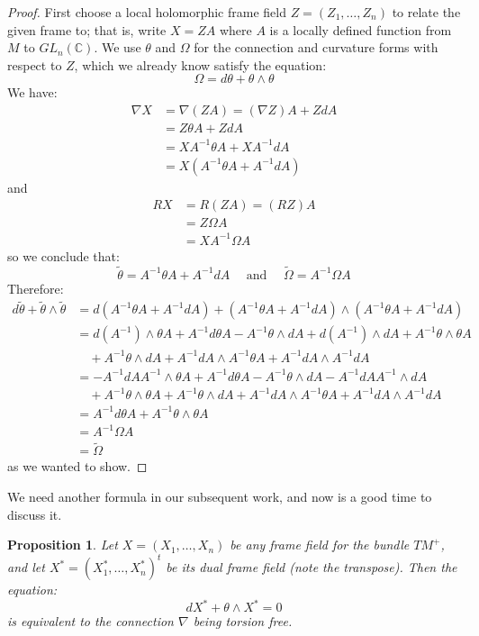 \documentclass[11pt]{amsart}
\newtheorem{prop}[subsection]{Proposition}
\theoremstyle{definition}
\def \C{ \mathbb{C} }
\def \thetasquig{ \tilde{\theta} }
\def \Omegasquig{ \tilde{\Omega} }
\begin{document}
\begin{proof}
%
First choose a local holomorphic frame field $Z = (Z_1, \ldots, Z_n)$ to relate the given frame to; that is, write $X = ZA$ where $A$ is a locally defined function from $M$ to $GL_n (\C)$.  We use $\theta$ and $\Omega$ for the connection and curvature forms with respect to $Z$, which we already know satisfy the equation:
%
$$ \Omega = d \theta + \theta \wedge \theta $$
%
We have:
%
\begin{align*}
\nabla X &= \nabla( ZA ) = (\nabla Z) A + Z dA \\
&= Z \theta A + Z dA \\ 
&= X A^{-1} \theta A + X A^{-1} dA \\
&= X( A^{-1} \theta A + A^{-1} dA )
\end{align*}
%
and
%
\begin{align*}
RX &= R(ZA) = (RZ)A \\
&= Z \Omega A \\
&= X A^{-1} \Omega A
\end{align*}
%
so we conclude that:
%
$$ \thetasquig = A^{-1} \theta A + A^{-1} dA \quad \text{ and } \quad \Omegasquig = A^{-1} \Omega A $$
%
Therefore:
%
\begin{align*}
%
d \thetasquig + \thetasquig \wedge \thetasquig &= d( A^{-1} \theta A + A^{-1} dA ) + (A^{-1} \theta A + A^{-1} dA) \wedge ( A^{-1} \theta A + A^{-1} dA )\\
%
&= d( A^{-1} ) \wedge \theta A + A^{-1} d \theta A - A^{-1} \theta \wedge dA + d ( A^{-1} ) \wedge dA + A^{-1} \theta \wedge \theta A \\
& \quad + A^{-1} \theta \wedge dA + A^{-1} dA \wedge A^{-1} \theta A + A^{-1} dA \wedge A^{-1} dA \\
%
&= - A^{-1} dA A^{-1} \wedge \theta A + A^{-1} d \theta A - A^{-1} \theta \wedge dA - A^{-1} dA A^{-1} \wedge dA \\
& \quad + A^{-1} \theta \wedge \theta A + A^{-1} \theta \wedge dA + A^{-1} dA \wedge A^{-1} \theta A + A^{-1} dA \wedge A^{-1} dA \\
%
&= A^{-1} d \theta A + A^{-1} \theta \wedge \theta A \\
&= A^{-1} \Omega A \\
&= \Omegasquig
%
\end{align*}
%
as we wanted to show.
%
\end{proof}

We need another formula in our subsequent work, and now is a good time to discuss it.

\begin{prop} Let $X = (X_1, \ldots, X_n)$ be any frame field for the bundle $TM^{+}$, and let $X^{\ast} = ( X_1^{\ast}, \ldots, X_n^{\ast} )^t$ be its dual frame field (note the transpose).  Then the equation:
%
$$ d X^{\ast} + \theta \wedge X^{\ast} = 0$$
%
is equivalent to the connection $\nabla$ being torsion free.
\end{prop}
\end{document}
